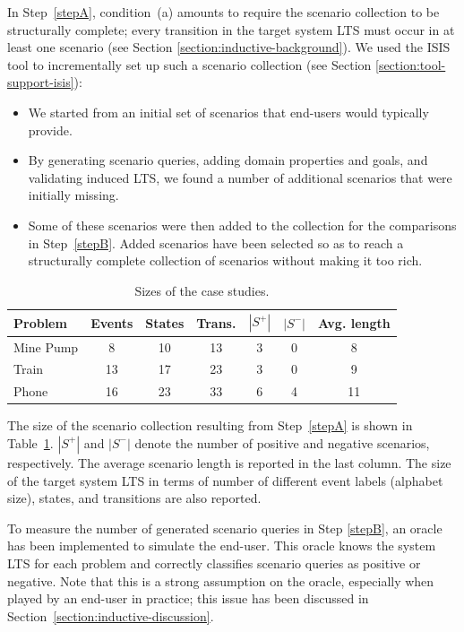 In Step~\ref{stepA}, condition~(a) amounts to require the scenario collection to be structurally complete; every transition in the target system LTS must occur in at least one scenario (see Section \ref{section:inductive-background}). We used the ISIS tool to incrementally set up such a scenario collection (see Section \ref{section:tool-support-isis}):
\begin{itemize}
\item We started from an initial set of scenarios that end-users would typically provide.
\item By generating scenario queries, adding domain properties and goals, and validating induced LTS, we found a number of additional scenarios that were initially missing. 
\item Some of these scenarios were then added to the collection for the comparisons in Step~\ref{stepB}. Added scenarios have been selected so as to reach a structurally complete collection of scenarios without making it too rich.
\end{itemize}

\begin{table}[H]
\centering
\begin{tabular}{|l||c|c|c||c|c|c|}\hline
Problem  & Events & States & Trans. & $|S^+|$ & $|S^-|$ & Avg. length\\\hline\hline
Mine Pump& 8      & 10     & 13          & 3     & 0     & 8\\\hline
Train    & 13     & 17     & 23          & 3     & 0     & 9\\\hline
Phone    & 16     & 23     & 33          & 6     & 4     & 11\\\hline
\end{tabular}
\caption{Sizes of the case studies.\label{CaseStudies}}
\end{table}

The size of the scenario collection resulting from Step~\ref{stepA} is shown in Table~\ref{CaseStudies}. $|S^+|$ and $|S^-|$ denote the number of positive and negative scenarios, respectively. The average scenario length is reported in the last column. The size of the target system LTS in terms of number of different event labels (alphabet size), states, and transitions are also reported. 

To measure the number of generated scenario queries in Step \ref{stepB}, an oracle has been implemented to simulate the end-user. This oracle knows the system LTS for each problem and correctly classifies scenario queries as positive or negative. Note that this is a strong assumption on the oracle, especially when played by an end-user in practice; this issue has been discussed in Section~\ref{section:inductive-discussion}.

